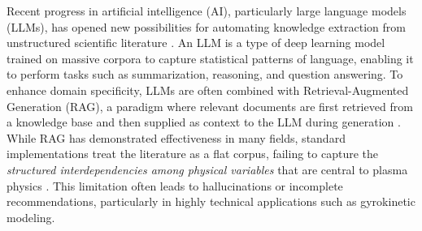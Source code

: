 \documentclass[journal]{IEEEtran}
\begin{document}
Recent progress in {artificial intelligence (AI)}, particularly large language models (LLMs), has opened new possibilities for automating knowledge extraction from unstructured scientific literature \cite{10172151}. An LLM is a type of deep learning model trained on massive corpora to capture statistical patterns of language, enabling it to perform tasks such as summarization, reasoning, and question answering. To enhance domain specificity, LLMs are often combined with Retrieval-Augmented Generation (RAG), a paradigm where relevant documents are first retrieved from a knowledge base and then supplied as context to the LLM during generation \cite{gao2023retrieval}. While RAG has demonstrated effectiveness in many fields, standard implementations treat the literature as a flat corpus, failing to capture the \textit{structured interdependencies among physical variables} that are central to plasma physics \cite{10531073}. This limitation often leads to hallucinations or incomplete recommendations, particularly in highly technical applications such as gyrokinetic modeling.
\end{document}
